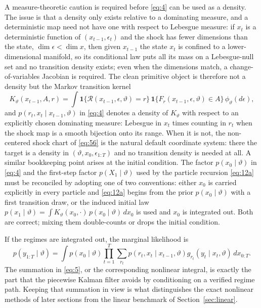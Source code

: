 \documentclass[11pt]{article}
\begin{document}
A measure-theoretic caution is required before \eqref{eq:4} can be used as a
density. The issue is that a density only exists relative to a dominating
measure, and a deterministic map need not have one with respect to Lebesgue
measure: if \(x_t\) is a deterministic function of \((x_{t-1},\epsilon_t)\)
and the shock has fewer dimensions than the state,
\(\dim\epsilon<\dim x\), then given \(x_{t-1}\) the state \(x_t\) is confined
to a lower-dimensional manifold, so its conditional law puts all its mass on
a Lebesgue-null set and no transition density exists; even when the
dimensions match, a change-of-variables Jacobian is required. The clean
primitive object is therefore not a density but the Markov transition kernel
\begin{equation}\label{eq:4a}
 K_\vartheta(x_{t-1},A,r)
 =\int \mathbf 1\{\mathcal R(x_{t-1},\epsilon,\vartheta)=r\}\,
       \mathbf 1\{F_r(x_{t-1},\epsilon,\vartheta)\in A\}\,
       \phi_\vartheta(d\epsilon),
\end{equation}
and \(p(r_t,x_t\mid x_{t-1},\vartheta)\) in \eqref{eq:4} denotes a density of
\(K_\vartheta\) with respect to an explicitly chosen dominating measure:
Lebesgue in \(x_t\) times counting in \(r_t\) when the shock map is a smooth
bijection onto its range. When it is not, the non-centered shock chart of
\eqref{eq:56} is the natural default coordinate system: there the target is a
density in \((\vartheta,x_0,\epsilon_{1:T})\) and no transition density is
needed at all. A similar bookkeeping point arises at the initial condition.
The factor \(p(x_0\mid\vartheta)\) in \eqref{eq:4} and the first-step factor
\(p(X_1\mid\vartheta)\) used by the particle recursion \eqref{eq:12a} must be
reconciled by adopting one of two conventions: either \(x_0\) is carried
explicitly in every particle and \eqref{eq:12a} begins from the prior
\(p(x_0\mid\vartheta)\) with a first transition draw, or the induced initial
law \(p(x_1\mid\vartheta)=\int K_\vartheta(x_0,\cdot)\,
p(x_0\mid\vartheta)\,dx_0\) is used and \(x_0\) is integrated out. Both are
correct; mixing them double-counts or drops the initial condition.

If the regimes are integrated out, the marginal likelihood is
\begin{equation}\label{eq:5}
 p(y_{1:T}\mid\vartheta)=
 \int p(x_0\mid\vartheta)
 \prod_{t=1}^T\sum_{r_t}p(r_t,x_t\mid x_{t-1},\vartheta)
 g_{r_t}(y_t\mid x_t,\vartheta)\,dx_{0:T}.
\end{equation}
The summation in \eqref{eq:5}, or the corresponding nonlinear integral, is
exactly the part that the piecewise Kalman filter avoids by conditioning on a
verified regime path. Keeping that summation in view is what distinguishes
the exact nonlinear methods of later sections from the linear benchmark of
Section~\ref{sec:linear}.
\end{document}
